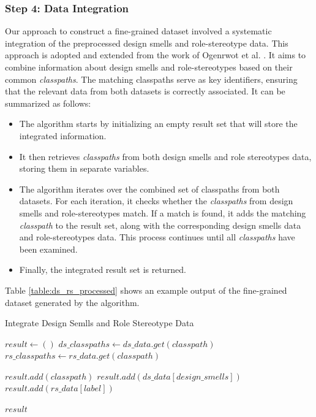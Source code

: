 \documentclass[AMA,Times1COL]{WileyNJDv5} %
\begin{document}
	\subsubsection*{Step 4: Data Integration}
	Our approach to construct a fine-grained  dataset involved a systematic integration of the preprocessed design smells and role-stereotype data. This approach is adopted and extended from the work of Ogenrwot et al. \cite{ogenrwot2021integration}. It aims to combine information about design smells and role-stereotypes based on their common {\it classpaths}. The matching classpaths serve as key identifiers, ensuring that the relevant data from both datasets is correctly associated. It can be summarized as follows:
	\begin{itemize}
		\item The algorithm starts by initializing an empty result set that will store the integrated information. 
		\item It then retrieves {\it classpaths} from both design smells and role stereotypes data, storing them in separate variables. 
		\item The algorithm iterates over the combined set of classpaths from both datasets. For each iteration, it checks whether the {\it classpaths} from design smells and role-stereotypes match. If a match is found, it adds the matching {\it classpath} to the result set, along with the corresponding design smells data and role-stereotypes data. This process continues until all {\it classpaths} have been examined. \item Finally, the integrated result set is returned.
	\end{itemize}
	Table \ref{table:ds_rs_processed} shows an example output of the fine-grained dataset generated by the algorithm. 
	
	
	\begin{algorithm}
		\caption{\enskip Integrate Design Semlls and Role Stereotype Data}\label{alg2}
		\begin{algorithmic}
			\State $result \leftarrow ()$ 
			\State $ds\_classpaths \leftarrow ds\_data.get(classpath)$  
			\State $rs\_classpaths \leftarrow rs\_data.get(classpath)$  
			
			 
			\State $result.add(classpath)$ 
			\State $result.add(ds\_data[design\_smells])$ 
			\State $result.add(rs\_data[label])$ 
			\EndIf
			\EndFor
			
			\State \Return $result$ 
			\EndProcedure
		\end{algorithmic}
		\label{al:data_integrated}
	\end{algorithm}
	
\end{document}
